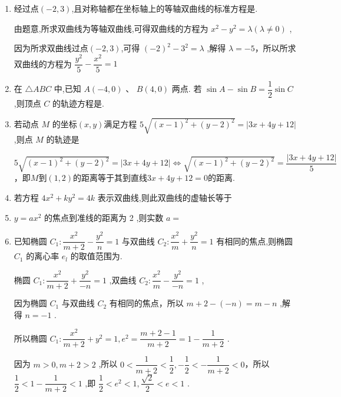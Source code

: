 \begin{enumerate}
\begin{jieda}
        \ps 代数推导：设点$M(x,y)$，$\sqrt{x^2+(y-2)^2} = y+1$，平方可得$x^2 = 6y-3$.
    \end{jieda}
    \item 经过点$(-2,3)$,且对称轴都在坐标轴上的等轴双曲线的标准方程是.
    \begin{jieda}
        由题意,所求双曲线为等轴双曲线,可得双曲线的方程为 ${x}^{2} - {y}^{2} = \lambda \left( {\lambda  \neq  0}\right)$ ,
        
        因为所求双曲线过点$(-2,3)$,可得 ${\left( -2\right) }^{2} - {3}^{2} = \lambda$ ,解得 $\lambda  =  - 5$，所以所求双曲线的方程为 $\dfrac{{y}^{2}}{5} - \dfrac{{x}^{2}}{5} = 1$ 
    \end{jieda}
    \item 在 $\bigtriangleup {ABC}$ 中,已知 $A\left( {-4,0}\right) \text{ 、 }B\left( {4,0}\right)$ 两点. 若 $\sin A - \sin B = \dfrac{1}{2}\sin C$ ,则顶点 $C$ 的轨迹方程是.
    \item 若动点 $M$ 的坐标$(x, y)$满足方程 $5\sqrt{{\left( x - 1\right) }^{2} + {\left( y - 2\right) }^{2}} = \left| {{3x} + {4y} + {12}}\right|$ ,则点 $M$ 的轨迹是
    \begin{jieda}
        $5\sqrt{{\left( x - 1\right) }^{2} + {\left( y - 2\right) }^{2}} = \left| {{3x} + {4y} + {12}}\right| \Longleftrightarrow \sqrt{{\left( x - 1\right) }^{2} + {\left( y - 2\right) }^{2}} = \dfrac{\left| {{3x} + {4y} + {12}}\right|}{5}$，即$M$到$(1,2)$的距离等于其到直线$3x+4y+12 = 0$的距离.
    \end{jieda}
    \item 若方程 $4{x}^{2} + k{y}^{2} = {4k}$ 表示双曲线,则此双曲线的虚轴长等于
    \item  $y = a{x}^{2}$ 的焦点到准线的距离为 2 ,则实数 $a =$
    \item 已知椭圆 ${C}_{1} : \dfrac{{x}^{2}}{m + 2} - \dfrac{{y}^{2}}{n} = 1$ 与双曲线 ${C}_{2} : \dfrac{{x}^{2}}{m} + \dfrac{{y}^{2}}{n} = 1$ 有相同的焦点,则椭圆 ${C}_{1}$ 的离心率 ${e}_{l}$ 的取值范围为.
    \begin{jieda}
        椭圆 ${C}_{1} : \dfrac{{x}^{2}}{m + 2} + \dfrac{{y}^{2}}{-n} = 1$ ,双曲线 ${C}_{2} : \dfrac{{x}^{2}}{m} - \dfrac{{y}^{2}}{-n} = 1$ ,
        
        因为椭圆 ${C}_{1}$ 与双曲线 ${C}_{2}$ 有相同的焦点，所以 $m + 2 - \left( {-n}\right)  = m - n$ ,解得 $n =  - 1$ .
        
        所以椭圆 ${C}_{1} : \dfrac{{x}^{2}}{m + 2} + {y}^{2} = 1,{e}^{2} = \dfrac{m + 2 - 1}{m + 2} = 1 - \dfrac{1}{m + 2}$ .
        
        因为 $m > 0,m + 2 > 2$ ,所以 $0 < \dfrac{1}{m + 2} < \dfrac{1}{2}, - \dfrac{1}{2} <  - \dfrac{1}{m + 2} < 0$，所以 $\dfrac{1}{2} < 1 - \dfrac{1}{m + 2} < 1$ ,即 $\dfrac{1}{2} < {e}^{2} < 1,\dfrac{\sqrt{2}}{2} < e < 1$ .

    \end{jieda}
\end{enumerate}

